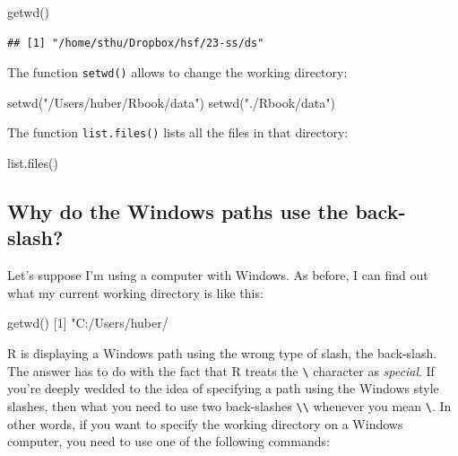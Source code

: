 \documentclass[
  12pt,
  oneside]{book}
\newenvironment{Shaded}{\begin{snugshade}}{\end{snugshade}}
\newcommand{\DecValTok}[1]{\textcolor[rgb]{0.00,0.00,0.81}{#1}}
\newcommand{\FunctionTok}[1]{\textcolor[rgb]{0.00,0.00,0.00}{#1}}
\newcommand{\NormalTok}[1]{#1}
\newcommand{\StringTok}[1]{\textcolor[rgb]{0.31,0.60,0.02}{#1}}
\begin{document}
\begin{Shaded}
\begin{Highlighting}[]
\FunctionTok{getwd}\NormalTok{()}
\end{Highlighting}
\end{Shaded}

\begin{verbatim}
## [1] "/home/sthu/Dropbox/hsf/23-ss/ds"
\end{verbatim}

The function \texttt{setwd()} allows to change the working directory:

\begin{Shaded}
\begin{Highlighting}[]
\FunctionTok{setwd}\NormalTok{(}\StringTok{"/Users/huber/Rbook/data"}\NormalTok{)}
\FunctionTok{setwd}\NormalTok{(}\StringTok{"./Rbook/data"}\NormalTok{)}
\end{Highlighting}
\end{Shaded}

The function \texttt{list.files()} lists all the files in that directory:

\begin{Shaded}
\begin{Highlighting}[]
\FunctionTok{list.files}\NormalTok{()}
\end{Highlighting}
\end{Shaded}

\hypertarget{sec:winbackslash}{%
\subsection{Why do the Windows paths use the back-slash?}\label{sec:winbackslash}}

Let's suppose I'm using a computer with Windows. As before, I can find out what my current working directory is like this:

\begin{Shaded}
\begin{Highlighting}[]
\FunctionTok{getwd}\NormalTok{()}
\NormalTok{[}\DecValTok{1}\NormalTok{] }\StringTok{"C:/Users/huber/}
\end{Highlighting}
\end{Shaded}

R is displaying a Windows path using the wrong type of slash, the back-slash. The answer has to do with the fact that R treats the \texttt{\textbackslash{}} character as \emph{special}. If you're deeply wedded to the idea of specifying a path using the Windows style slashes, then what you need to use two back-slashes \texttt{\textbackslash{}\textbackslash{}} whenever you mean \texttt{\textbackslash{}}. In other words, if you want to specify the working directory on a Windows computer, you need to use one of the following commands:
\end{document}
